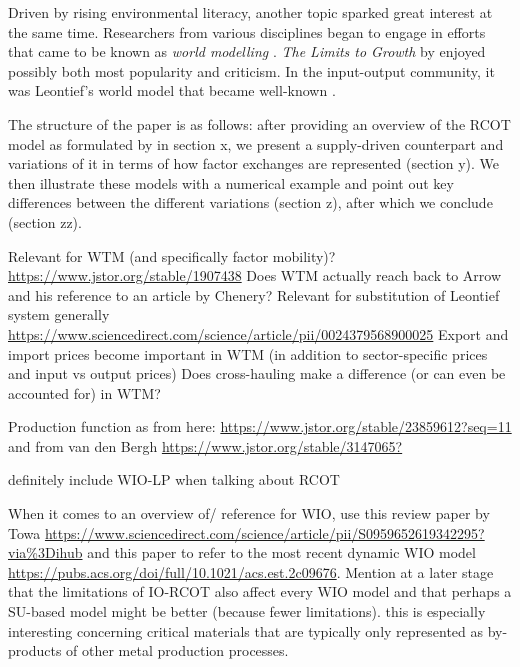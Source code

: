\documentclass{article}
\begin{document}
\begin{refsection}
Driven by rising environmental literacy, another topic sparked great interest at the same time. Researchers from various disciplines began to engage in efforts that came to be known as \textit{world modelling} \parencite{fontela_2004}. \textit{The Limits to Growth} by \textcite{meadows_1972} enjoyed possibly both most popularity and criticism. In the input-output community, it was Leontief's world model that became well-known \parencite{leontief_1970,leontief_1977}. 

The structure of the paper is as follows: after providing an overview of the RCOT model as formulated by \textcite{duchin_2011} in section x, we present a supply-driven counterpart and variations of it in terms of how factor exchanges are represented (section y). We then illustrate these models with a numerical example and point out key differences between the different variations (section z), after which we conclude (section zz).

Relevant for WTM (and specifically factor mobility)? \url{https://www.jstor.org/stable/1907438} Does WTM actually reach back to Arrow and his reference to an article by Chenery?
Relevant for substitution of Leontief system generally \url{https://www.sciencedirect.com/science/article/pii/0024379568900025}
Export and import prices become important in WTM (in addition to sector-specific prices and input vs output prices)
Does cross-hauling make a difference (or can even be accounted for) in WTM?

Production function as from here: \url{https://www.jstor.org/stable/23859612?seq=11} and from van den Bergh \url{https://www.jstor.org/stable/3147065?}

definitely include WIO-LP when talking about RCOT

When it comes to an overview of/ reference for WIO, use this review paper by Towa \url{https://www.sciencedirect.com/science/article/pii/S0959652619342295?via%3Dihub} and this paper to refer to the most recent dynamic WIO model \url{https://pubs.acs.org/doi/full/10.1021/acs.est.2c09676}. Mention at a later stage that the limitations of IO-RCOT also affect every WIO model and that perhaps a SU-based model might be better (because fewer limitations). this is especially interesting concerning critical materials that are typically only represented as by-products of other metal production processes.


\end{refsection}
\end{document}
